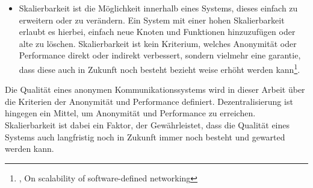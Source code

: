 \begin{itemize}
\item Skalierbarkeit ist die Möglichkeit innerhalb eines Systems, dieses einfach zu erweitern oder zu verändern. Ein System mit einer hohen Skalierbarkeit erlaubt es hierbei, einfach neue Knoten und Funktionen hinzuzufügen oder alte zu löschen. Skalierbarkeit ist kein Kriterium, welches Anonymität oder Performance direkt oder indirekt verbessert, sondern vielmehr eine garantie, dass diese auch in Zukunft noch besteht bezieht weise erhöht werden kann\footnote{\cite{ScalabilityOfNetworking}, On scalability of software-defined networking}.

\end{itemize}

Die Qualität eines anonymen Kommunikationssystems wird in dieser Arbeit über die Kriterien der Anonymität und Performance definiert. Dezentralisierung ist hingegen ein Mittel, um Anonymität und Performance zu erreichen. Skalierbarkeit ist dabei ein Faktor, der Gewährleistet, dass die Qualität eines Systems auch langfristig noch in Zukunft immer noch besteht und gewarted werden kann.